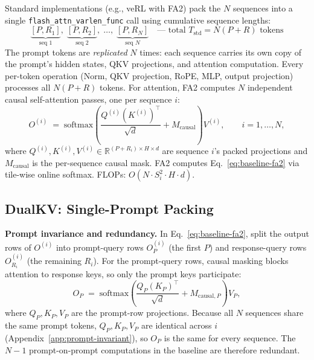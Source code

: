\documentclass{article}
\begin{document}
Standard implementations (e.g., veRL with FA2) pack the $N$ sequences into a single \texttt{flash\_attn\_varlen\_func} call using cumulative sequence lengths:
\begin{equation}
  \underbrace{[P, R_1]}_{\text{seq 1}},\; \underbrace{[P, R_2]}_{\text{seq 2}},\; \ldots,\; \underbrace{[P, R_N]}_{\text{seq } N}
  \quad\text{--- total } T_{\text{std}} = N(P + R) \text{ tokens}
  \label{eq:std-packing}
\end{equation}
The prompt tokens are \emph{replicated} $N$ times: each sequence carries its own copy of the prompt's hidden states, QKV projections, and attention computation. Every per-token operation (Norm, QKV projection, RoPE, MLP, output projection) processes all $N(P+R)$ tokens. For attention, FA2 computes $N$ independent causal self-attention passes, one per sequence $i$:
\begin{equation}
  O^{(i)} \;=\; \text{softmax}\!\left(\frac{Q^{(i)} (K^{(i)})^\top}{\sqrt{d}} + M_{\text{causal}}\right) V^{(i)}, \qquad i = 1, \ldots, N,
  \label{eq:baseline-fa2}
\end{equation}
where $Q^{(i)}, K^{(i)}, V^{(i)} \in \mathbb{R}^{(P+R_i) \times H \times d}$ are sequence $i$'s packed projections and $M_{\text{causal}}$ is the per-sequence causal mask. FA2 computes Eq.~\ref{eq:baseline-fa2} via tile-wise online softmax. FLOPs: $O(N \cdot S_i^2 \cdot H \cdot d)$.

\subsection{DualKV: Single-Prompt Packing}
\label{sec:dualkv-packing}

\textbf{Prompt invariance and redundancy.} In Eq.~\ref{eq:baseline-fa2}, split the output rows of $O^{(i)}$ into prompt-query rows $O_P^{(i)}$ (the first $P$) and response-query rows $O_{R_i}^{(i)}$ (the remaining $R_i$). For the prompt-query rows, causal masking blocks attention to response keys, so only the prompt keys participate:
\begin{equation}
  O_P \;=\; \text{softmax}\!\left(\frac{Q_P (K_P)^\top}{\sqrt{d}} + M_{\text{causal},P}\right) V_P,
  \label{eq:prompt-subblock}
\end{equation}
where $Q_P, K_P, V_P$ are the prompt-row projections. Because all $N$ sequences share the same prompt tokens, $Q_P, K_P, V_P$ are identical across $i$ (Appendix~\ref{app:prompt-invariant}), so $O_P$ is the same for every sequence. The $N-1$ prompt-on-prompt computations in the baseline are therefore redundant.
\end{document}
